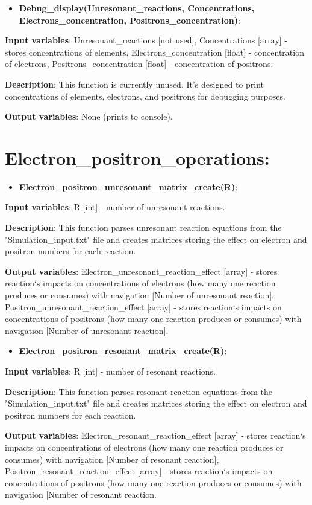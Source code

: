 \documentclass[a4paper,12pt]{article}
\newcommand{\namefunction}[4]{
  \begin{itemize}
    \item \textbf{#1}:
  \end{itemize}
  
  \textbf{Input variables}: #2.
  
  \textbf{Description}: #3.
  
  \textbf{Output variables}: #4.
}
\begin{document}
\vspace{1em}

\namefunction{Debug\_display(Unresonant\_reactions, Concentrations, Electrons\_concentration, Positrons\_concentration)}{Unresonant\_reactions [not used], Concentrations [array] - stores concentrations of elements, Electrons\_concentration [float] - concentration of electrons, Positrons\_concentration [float] - concentration of positrons}{This function is currently unused. It's designed to print concentrations of elements, electrons, and positrons for debugging purposes}{None (prints to console)}

\section{Electron\_positron\_operations:}

\vspace{1em}

\namefunction{Electron\_positron\_unresonant\_matrix\_create(R)}{R [int] - number of unresonant reactions}{This function parses unresonant reaction equations from the "Simulation\_input.txt" file and creates matrices storing the effect on electron and positron numbers for each reaction}{Electron\_unresonant\_reaction\_effect [array] - stores reaction`s  impacts on concentrations of electrons (how many one reaction produces or consumes) with navigation [Number of unresonant reaction], Positron\_unresonant\_reaction\_effect [array] - stores reaction`s  impacts on concentrations of positrons (how many one reaction produces or consumes) with navigation [Number of unresonant reaction]}

\vspace{1em}

\namefunction{Electron\_positron\_resonant\_matrix\_create(R)}{R [int] - number of resonant reactions}{This function parses resonant reaction equations from the "Simulation\_input.txt" file and creates matrices storing the effect on electron and positron numbers for each reaction}{Electron\_resonant\_reaction\_effect [array] - stores reaction`s  impacts on concentrations of electrons (how many one reaction produces or consumes) with navigation [Number of resonant reaction], Positron\_resonant\_reaction\_effect [array] - stores reaction`s  impacts on concentrations of positrons (how many one reaction produces or consumes) with navigation [Number of resonant reaction}

\vspace{1em}
\end{document}

